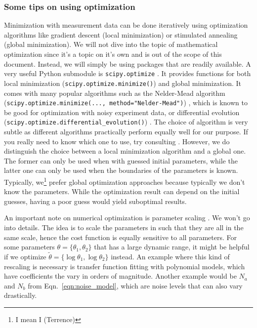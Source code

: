 \subsubsection{Some tips on using optimization \label{sec:optimization_tips}}
Minimization with measurement data can be done iteratively using optimization algorithms like gradient descent \cite{enwiki:1019572955} (local minimization) or stimulated annealing \cite{enwiki:1017509035} (global minimization).
We will not dive into the topic of mathematical optimization since it's a topic on it's own and is out of the scope of this document.
Instead, we will simply be using packages that are readily available.
A very useful Python submodule is \verb|scipy.optimize| \cite{scipy_optimize}.
It provides functions for both local minimization (\verb|scipy.optimize.minimize()|) and global minimization.
It comes with many popular algorithms such as the Nelder-Mead algorithm (\verb|scipy.optimize.minimize(..., method="Nelder-Mead")|) \cite{wiki:nelder_mead}, which is known to be good for optimization with noisy experiment data, or differential evolution \linebreak(\verb|scipy.optimize.differential_evolution()|) \cite{wiki:differential_evolution}.
The choice of algorithm is very subtle as different algorithms practically perform equally well for our purpose.
If you really need to know which one to use, try consulting \cite{scipy_mathematical_optimization}.
However, we do distinguish the choice between a local minimization algorithm and a global one.
The former can only be used when with guessed initial parameters, while the latter one can only be used when the boundaries of the parameters is known.
Typically, we\footnote{I mean I (Terrence)} prefer global optimization approaches because typically we don't know the parameters.
While the optimization result can depend on the initial guesses, having a poor guess would yield suboptimal results.

An important note on numerical optimization is parameter scaling \cite{wiki:preconditioner}.
We won't go into details.
The idea is to scale the parameters in such that they are all in the same scale, hence the cost function is equally sensitive to all parameters.
For some parameters $\theta=\{\theta_1,\theta_2\}$ that has a large dynamic range, it might be helpful if we optimize $\tilde{\theta}=\{\log\theta_1, \log\theta_2\}$ instead.
An example where this kind of rescaling is necessary is transfer function fitting with polynomial models, which have coefficients the vary in orders of magnitude.
Another example would be $N_a$ and $N_b$ from Eqn.~\eqref{eqn:noise_model}, which are noise levels that can also vary drastically.

